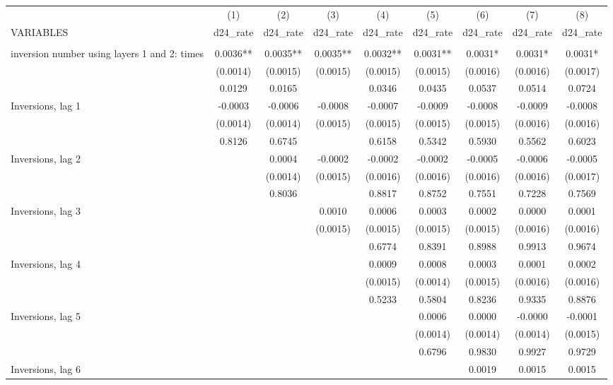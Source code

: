 \begin{tabular}{lcccccccc} \hline
 & (1) & (2) & (3) & (4) & (5) & (6) & (7) & (8) \\
VARIABLES & d24\_rate & d24\_rate & d24\_rate & d24\_rate & d24\_rate & d24\_rate & d24\_rate & d24\_rate \\ \hline
 &  &  &  &  &  &  &  &  \\
inversion number using layers 1 and 2: times & 0.0036** & 0.0035** & 0.0035** & 0.0032** & 0.0031** & 0.0031* & 0.0031* & 0.0031* \\
 & (0.0014) & (0.0015) & (0.0015) & (0.0015) & (0.0015) & (0.0016) & (0.0016) & (0.0017) \\
 & 0.0129 & 0.0165 &  & 0.0346 & 0.0435 & 0.0537 & 0.0514 & 0.0724 \\
Inversions, lag 1 & -0.0003 & -0.0006 & -0.0008 & -0.0007 & -0.0009 & -0.0008 & -0.0009 & -0.0008 \\
 & (0.0014) & (0.0014) & (0.0015) & (0.0015) & (0.0015) & (0.0015) & (0.0016) & (0.0016) \\
 & 0.8126 & 0.6745 &  & 0.6158 & 0.5342 & 0.5930 & 0.5562 & 0.6023 \\
Inversions, lag 2 &  & 0.0004 & -0.0002 & -0.0002 & -0.0002 & -0.0005 & -0.0006 & -0.0005 \\
 &  & (0.0014) & (0.0015) & (0.0016) & (0.0016) & (0.0016) & (0.0016) & (0.0017) \\
 &  & 0.8036 &  & 0.8817 & 0.8752 & 0.7551 & 0.7228 & 0.7569 \\
Inversions, lag 3 &  &  & 0.0010 & 0.0006 & 0.0003 & 0.0002 & 0.0000 & 0.0001 \\
 &  &  & (0.0015) & (0.0015) & (0.0015) & (0.0015) & (0.0016) & (0.0016) \\
 &  &  &  & 0.6774 & 0.8391 & 0.8988 & 0.9913 & 0.9674 \\
Inversions, lag 4 &  &  &  & 0.0009 & 0.0008 & 0.0003 & 0.0001 & 0.0002 \\
 &  &  &  & (0.0015) & (0.0014) & (0.0015) & (0.0016) & (0.0016) \\
 &  &  &  & 0.5233 & 0.5804 & 0.8236 & 0.9335 & 0.8876 \\
Inversions, lag 5 &  &  &  &  & 0.0006 & 0.0000 & -0.0000 & -0.0001 \\
 &  &  &  &  & (0.0014) & (0.0014) & (0.0014) & (0.0015) \\
 &  &  &  &  & 0.6796 & 0.9830 & 0.9927 & 0.9729 \\
Inversions, lag 6 &  &  &  &  &  & 0.0019 & 0.0015 & 0.0015 \\

\end{tabular}
